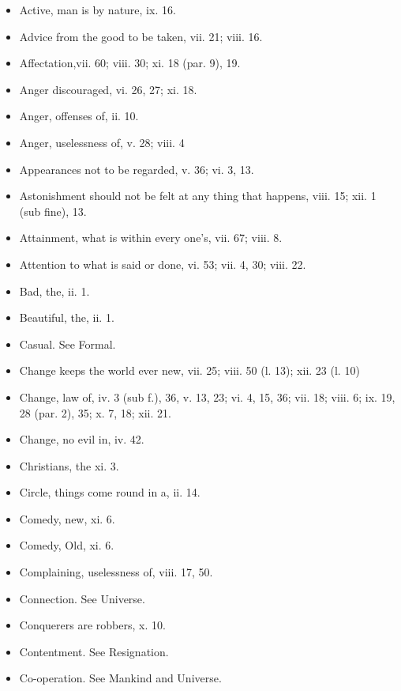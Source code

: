 \renewcommand\labelitemi{}
\begin{itemize}[leftmargin=*]
\setlength\itemsep{0em}
\item
  Active, man is by nature, ix. 16.
\item
  Advice from the good to be taken, vii. 21; viii. 16.
\item
  Affectation,vii. 60; viii. 30; xi. 18 (par. 9), 19.
\item
  Anger discouraged, vi. 26, 27; xi. 18.
\item
  Anger, offenses of, ii. 10.
\item
  Anger, uselessness of, v. 28; viii. 4
\item
  Appearances not to be regarded, v. 36; vi. 3, 13.
\item
  Astonishment should not be felt at any thing that happens, viii. 15;
  xii. 1 (sub fine), 13.
\item
  Attainment, what is within every one's, vii. 67; viii. 8.
\item
  Attention to what is said or done, vi. 53; vii. 4, 30; viii. 22.
\end{itemize}

\begin{itemize}[leftmargin=*]
\setlength\itemsep{0em}
\item
  Bad, the, ii. 1.
\item
  Beautiful, the, ii. 1.
\end{itemize}

\begin{itemize}[leftmargin=*]
\setlength\itemsep{0em}
\item
  Casual. See Formal.
\item
  Change keeps the world ever new, vii. 25; viii. 50 (l. 13); xii. 23
  (l. 10)
\item
  Change, law of, iv. 3 (sub f.), 36, v. 13, 23; vi. 4, 15, 36; vii. 18;
  viii. 6; ix. 19, 28 (par. 2), 35; x. 7, 18; xii. 21.
\item
  Change, no evil in, iv. 42.
\item
  Christians, the xi. 3.
\item
  Circle, things come round in a, ii. 14.
\item
  Comedy, new, xi. 6.
\item
  Comedy, Old, xi. 6.
\item
  Complaining, uselessness of, viii. 17, 50.
\item
  Connection. See Universe.
\item
  Conquerers are robbers, x. 10.
\item
  Contentment. See Resignation.
\item
  Co-operation. See Mankind and Universe.
\end{itemize}

